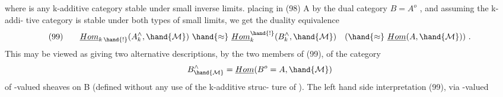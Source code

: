 where  is any k-additive category stable under small inverse limits.
 placing in (98)  A by the dual category $B=A^{o}$ ,  and  assuming the k-addi-%
tive category  is stable under both types of small limits,  we get the
duality equivalence
\[ (99) \qquad \underline{Hom}_{k\,\hand{!}}(A^{\wedge}_{k} , \hand{\mathcal{M}}) \ \hand{\approx}\ \underline{Hom}_{k}^{\hand{!}}(B^{\wedge}_{k} , \hand{\mathcal{M}}) \quad ( \hand{\approx}\ \underline{Hom}(A, \hand{\mathcal{M}}) ) \ . \]
This may be viewed as giving two alternative descriptions,  by the two
members of (99), of the category 
\[ B^{\wedge}_{\hand{\mathcal{M}}} = \underline{Hom}(B^{o}=A , \hand{\mathcal{M}}) \]
of -valued sheaves on B (defined without any use of the k-additive struc-%
ture of ).  The left hand side interpretation (99),  via -valued

